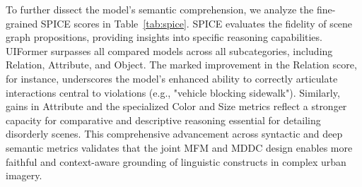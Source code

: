\documentclass[lettersize,journal]{IEEEtran}
\begin{document}
	To further dissect the model's semantic comprehension, we analyze the fine-grained SPICE scores in Table~\ref{tab:spice}. SPICE evaluates the fidelity of scene graph propositions, providing insights into specific reasoning capabilities. UIFormer surpasses all compared models across all subcategories, including Relation, Attribute, and Object. The marked improvement in the Relation score, for instance, underscores the model's enhanced ability to correctly articulate interactions central to violations (e.g., "vehicle blocking sidewalk"). Similarly, gains in Attribute and the specialized Color and Size metrics reflect a stronger capacity for comparative and descriptive reasoning essential for detailing disorderly scenes. This comprehensive advancement across syntactic and deep semantic metrics validates that the joint MFM and MDDC design enables more faithful and context-aware grounding of linguistic constructs in complex urban imagery.
	
	\begin{table}
		\small
		\centering
		\captionsetup{justification=justified}
		\setlength{\tabcolsep}{.5em}
		\caption{Captioning results of UIFormer using different numbers of encoder and decoder layers.}
		\label{tab:layers}
		\vspace{-0.3cm}
	\end{table}
	
	\begin{table}[t]
		\small
		\centering
		\captionsetup{justification=justified}
		\setlength{\tabcolsep}{.5em}
		\caption{Captioning results of UIFormer using different numbers of attention heads.}
		\label{tab:num_att_heads}
		\vspace{-0.3cm}
	\end{table}
	
\end{document}
